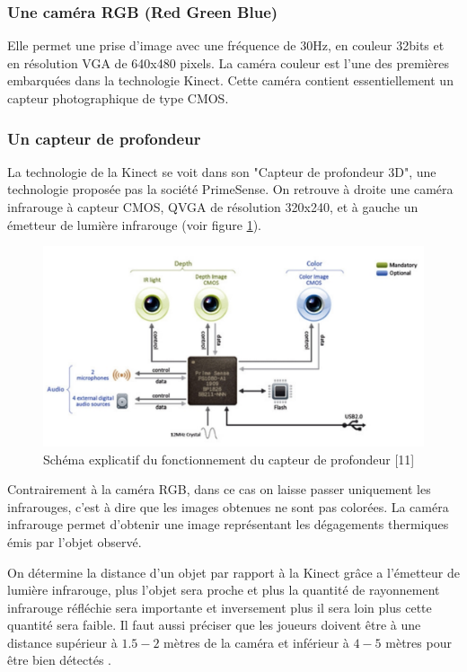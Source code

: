 \documentclass[12pt,a4paper,oneside]{book}
\begin{document}
	\subsubsection{Une caméra RGB (Red Green Blue)}
	Elle permet une prise d'image avec une fréquence de 30Hz, en couleur 32bits et en résolution VGA de 640x480 pixels. La caméra couleur est l'une des premières embarquées dans la technologie Kinect. Cette caméra contient essentiellement un capteur photographique de type CMOS.
	
	\subsubsection{Un capteur de profondeur}
	La technologie de la Kinect se voit dans son "Capteur de profondeur 3D", une technologie proposée pas la société PrimeSense. On retrouve à droite une caméra infrarouge à capteur CMOS, QVGA de résolution 320x240, et à gauche un émetteur de lumière infrarouge (voir figure \ref{fig1e5}).
	
	\begin{figure}[H]
		\centering
		\includegraphics[scale=0.4]{composantkinect.png}
		\caption{Schéma explicatif du fonctionnement du capteur de profondeur \textcolor[rgb]{1.00,0.00,0.00}{[11]} }
		\label{fig1e5}
	\end{figure}
	
	
	Contrairement à la caméra RGB, dans ce cas on laisse passer uniquement les infrarouges, c'est à dire que les images obtenues ne sont pas colorées. La caméra infrarouge permet d'obtenir une image représentant les dégagements thermiques émis par l'objet observé.
	
	On détermine la distance d'un objet par rapport à la Kinect grâce a l'émetteur de lumière infrarouge, plus l'objet sera proche et plus la quantité de rayonnement infrarouge réfléchie sera importante et inversement plus il sera loin plus cette quantité sera faible. Il faut aussi préciser que les joueurs doivent être à une distance supérieur à $1.5-2$ mètres de la caméra et inférieur à $4-5$ mètres pour être bien détectés .
	
\end{document}
